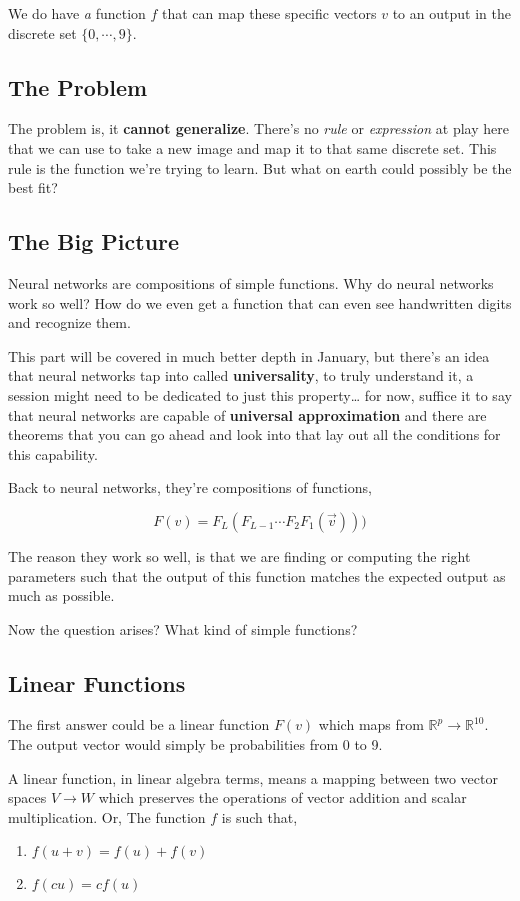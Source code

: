 \documentclass[11pt]{article}
\begin{document}
We do have \emph{a} function \(f\) that can map these specific vectors \(v\) to an output in the discrete set \(\{0, \cdots , 9\}\).
\subsection{The Problem}
\label{sec:orgd099db5}
The problem is, it \textbf{cannot generalize}. There's no \emph{rule} or \emph{expression} at play here that we can use to take a new image and map it to that same discrete set. This rule is the function we're trying to learn. But what on earth could possibly be the best fit?
\subsection{The Big Picture}
\label{sec:org0764267}
Neural networks are compositions of simple functions. Why do neural networks work so well? How do we even get a function that can even see handwritten digits and recognize them.

This part will be covered in much better depth in January, but there's an idea that neural networks tap into called \textbf{universality}, to truly understand it, a session might need to be dedicated to just this property\ldots{} for now, suffice it to say that neural networks are capable of \textbf{universal approximation} and there are theorems that you can go ahead and look into that lay out all the conditions for this capability.

Back to neural networks, they're compositions of functions,

$$F(v) = F_L(F_{L-1} \cdots F_2F_1(\vec{v})))$$

The reason they work so well, is that we are finding or computing the right parameters such that the output of this function matches the expected output as much as possible.

Now the question arises? What kind of simple functions?
\subsection{Linear Functions}
\label{sec:org97895bc}
The first answer could be a linear function \(F(v)\) which maps from \(\mathbb{R}^p \rightarrow \mathbb{R}^{10}\). The output vector would simply be probabilities from 0 to 9.

\begin{definition}
A linear function, in linear algebra terms, means a mapping between two vector spaces $V \rightarrow W$ which preserves the operations of vector addition and scalar multiplication.
Or,
The function $f$ is such that,
\begin{enumerate}
\item  $f(u+v) = f(u) + f(v)$
\item $f(cu) = cf(u)$
\end{enumerate}
\end{definition}
\end{document}
